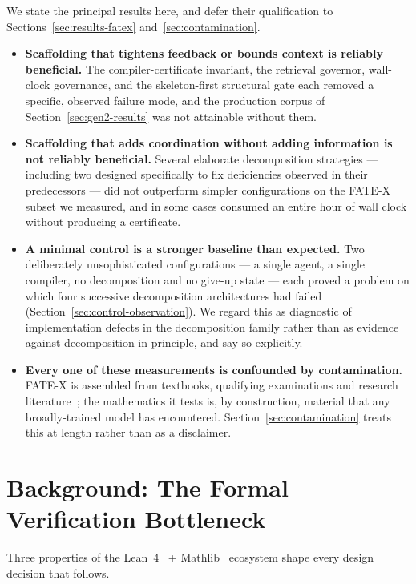 \documentclass[12pt, a4paper]{article}
\begin{document}
We state the principal results here, and defer their qualification to
Sections~\ref{sec:results-fatex} and~\ref{sec:contamination}.

\begin{itemize}[leftmargin=*]
  \item \textbf{Scaffolding that tightens feedback or bounds context is
    reliably beneficial.} The compiler-certificate invariant, the retrieval
    governor, wall-clock governance, and the skeleton-first structural gate
    each removed a specific, observed failure mode, and the production
    corpus of Section~\ref{sec:gen2-results} was not attainable without them.
  \item \textbf{Scaffolding that adds coordination without adding
    information is not reliably beneficial.} Several elaborate
    decomposition strategies --- including two designed specifically to fix
    deficiencies observed in their predecessors --- did not outperform
    simpler configurations on the FATE-X subset we measured, and in some
    cases consumed an entire hour of wall clock without producing a
    certificate.
  \item \textbf{A minimal control is a stronger baseline than expected.}
    Two deliberately unsophisticated configurations --- a single agent, a
    single compiler, no decomposition and no give-up state --- each proved a
    problem on which four successive decomposition architectures had failed
    (Section~\ref{sec:control-observation}). We regard this as diagnostic of
    implementation defects in the decomposition family rather than as
    evidence against decomposition in principle, and say so explicitly.
  \item \textbf{Every one of these measurements is confounded by
    contamination.} FATE-X is assembled from textbooks, qualifying
    examinations and research literature~\cite{fatex2025}; the mathematics it
    tests is, by construction, material that any broadly-trained model has
    encountered. Section~\ref{sec:contamination} treats this at length rather
    than as a disclaimer.
\end{itemize}

\section{Background: The Formal Verification Bottleneck}

Three properties of the Lean~4~\cite{demoura2021lean4} +
Mathlib~\cite{mathlib2020} ecosystem shape every design
decision that follows.
\end{document}
